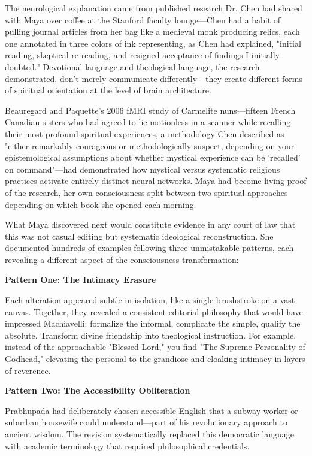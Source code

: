 \documentclass[12pt,twoside]{book}
\begin{document}
The neurological explanation came from published research Dr. Chen had shared with Maya over coffee at the Stanford faculty lounge—Chen had a habit of pulling journal articles from her bag like a medieval monk producing relics, each one annotated in three colors of ink representing, as Chen had explained, "initial reading, skeptical re-reading, and resigned acceptance of findings I initially doubted." Devotional language and theological language, the research demonstrated, don't merely communicate differently—they create different forms of spiritual orientation at the level of brain architecture.

Beauregard and Paquette's 2006 fMRI study of Carmelite nuns—fifteen French Canadian sisters who had agreed to lie motionless in a scanner while recalling their most profound spiritual experiences, a methodology Chen described as "either remarkably courageous or methodologically suspect, depending on your epistemological assumptions about whether mystical experience can be 'recalled' on command"—had demonstrated how mystical versus systematic religious practices activate entirely distinct neural networks. Maya had become living proof of the research, her own consciousness split between two spiritual approaches depending on which book she opened each morning.

What Maya discovered next would constitute evidence in any court of law that this was not casual editing but systematic ideological reconstruction. She documented hundreds of examples following three unmistakable patterns, each revealing a different aspect of the consciousness transformation:

\textbf{\textbf{Pattern One: The Intimacy Erasure}}

Each alteration appeared subtle in isolation, like a single brushstroke on a vast canvas. Together, they revealed a consistent editorial philosophy that would have impressed Machiavelli: formalize the informal, complicate the simple, qualify the absolute. Transform divine friendship into theological instruction. For example, instead of the approachable "Blessed Lord," you find "The Supreme Personality of Godhead," elevating the personal to the grandiose and cloaking intimacy in layers of reverence.

\textbf{\textbf{Pattern Two: The Accessibility Obliteration}}

Prabhupāda had deliberately chosen accessible English that a subway worker or suburban housewife could understand—part of his revolutionary approach to ancient wisdom. The revision systematically replaced this democratic language with academic terminology that required philosophical credentials.
\end{document}
